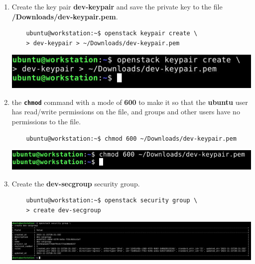 \documentclass[letterpaper, 12pt]{article}
\begin{document}
\begin{enumerate}
    \item Create the key pair \textbf{dev-keypair} and save the private key to the file
    \textbf{\texttildemid/Downloads/dev-keypair.pem}.
    \begin{lstlisting}
    ubuntu@workstation:~$ openstack keypair create \
    > dev-keypair > ~/Downloads/dev-keypair.pem
    \end{lstlisting}

    \begin{center}
        \includegraphics[width=\linewidth]{images/part4/step15.png}
    \end{center}

    \item the \textbf{\texttt{chmod}} command with a mode of \textbf{600} to make it so that the \textbf{ubuntu} user
    has read/write permissions on the file, and groups and other users have no permissions to the file.
    \begin{lstlisting}
    ubuntu@workstation:~$ chmod 600 ~/Downloads/dev-keypair.pem
    \end{lstlisting}

    \begin{center}
        \includegraphics[width=\linewidth]{images/part4/step16.png}
    \end{center}

    \item Create the \textbf{dev-secgroup} security group.
    \begin{lstlisting}
    ubuntu@workstation:~$ openstack security group \
    > create dev-secgroup
    \end{lstlisting}

    \begin{center}
        \includegraphics[width=\linewidth]{images/part4/step17.png}
    \end{center}


\end{enumerate}
\end{document}
